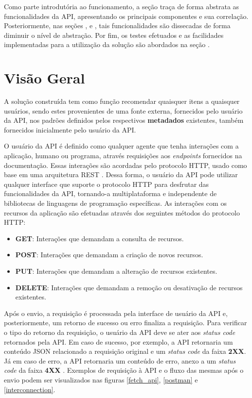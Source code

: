 \documentclass[12pt, openright, oneside, a4paper, brazil]{abntex2}
\begin{document}
Como parte introdutória ao funcionamento, a seção  traça de forma abstrata as funcionalidades da API, apresentando os principais componentes e sua correlação. Posteriormente, nas seções ,  e , tais funcionalidades são dissecadas de forma diminuir o nível de abstração. Por fim, os testes efetuados e as facilidades implementadas para a utilização da solução são abordados na seção .

\section{Visão Geral} \label{visao_geral}

A solução construída tem como função recomendar quaisquer itens a quaisquer usuários, sendo estes provenientes de uma fonte externa, fornecidos pelo usuário da API, nos padrões definidos pelos respectivos \textbf{metadados} existentes, também fornecidos inicialmente pelo usuário da API.

O usuário da API é definido como qualquer agente que tenha interações com a aplicação, humano ou programa, através requisições aos \textit{endpoints} fornecidos na documentação. Essas interações são acordadas pelo protocolo HTTP, usado como base em uma arquitetura REST \cite{rodriguez2008restful}. Dessa forma, o usuário da API pode utilizar qualquer interface que suporte o protocolo HTTP para desfrutar das funcionalidades da API, tornando-a multiplataforma e independente de bibliotecas de linguagens de programação específicas. As interações com os recursos da aplicação são efetuadas através dos seguintes métodos do protocolo HTTP:

\begin{itemize}
	\item \textbf{GET}: Interações que demandam a consulta de recursos.

	\item \textbf{POST}: Interações que demandam a criação de novos recursos.

	\item \textbf{PUT}: Interações que demandam a alteração de recursos existentes.

	\item \textbf{DELETE}: Interações que demandam a remoção ou desativação de recursos existentes.
\end{itemize}

Após o envio, a requisição é processada pela interface de usuário da API e, posteriormente, um retorno de sucesso ou erro finaliza a requisição. Para verificar o tipo do retorno da requisição, o usuário da API deve se ater aos \textit{status code} retornados pela API. Em caso de sucesso, por exemplo, a API retornaria um conteúdo JSON relacionado a requisição original e um \textit{status code} da faixa \textbf{2XX}. Já em caso de erro, a API retornaria um conteúdo de erro, anexo a um \textit{status code} da faixa \textbf{4XX} \cite{fielding1999hypertext}. Exemplos de requisição à API e o fluxo das mesmas após o envio podem ser visualizados nas figuras \ref{fetch_api}, \ref{postman} e \ref{interconnection}.
\end{document}
